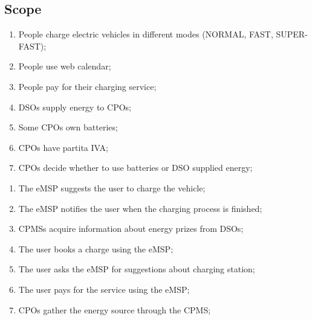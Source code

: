 \subsection{Scope}

\begin{enumerate}[label=\textbf{WP\arabic*}]
    \item People charge electric vehicles in different modes (NORMAL, FAST, SUPER-FAST); \label{world:people-charge-vehicles}
    \item People use web calendar; \label{world:people-use-calendars}
    \item People pay for their charging service; \label{world:people-pay-service}
    \item \acp{DSO} supply energy to \acp{CPO}; \label{world:DSO-supply-energy}
    \item Some \acp{CPO} own batteries; \label{world:CPO-own-batteries}
    \item \acp{CPO} have \gls{partita IVA};\label{world:CPO-have-partitaIVA}
    \item \acp{CPO} decide whether to use batteries or \ac{DSO} supplied energy; \label{world:CPO-decide-energy}
\end{enumerate}
\begin{enumerate}[label=\textbf{SP\arabic*}]
    \item The \ac{eMSP} suggests the user to charge the vehicle; \label{shared:eMSP-suggests-charge}
    \item The \ac{eMSP} notifies the user when the charging process is finished; \label{shared:eMSP-notifies-charging-finished}
    \item \acp{CPMS} acquire information about energy prizes from \acp{DSO}; \label{shared:CPMS-info-from-DSO}
    \item The user books a charge using the \ac{eMSP}; \label{shared:user-books-charge}
    \item The user asks the \ac{eMSP} for suggestions about charging station; \label{shared:user-asks-suggestions}
    \item The user pays for the service using the \ac{eMSP}; \label{shared:user-pays-service}
    \item \acp{CPO} gather the energy source through the \ac{CPMS}; \label{shared:CPO-energy-through-CPMS}
\end{enumerate}

